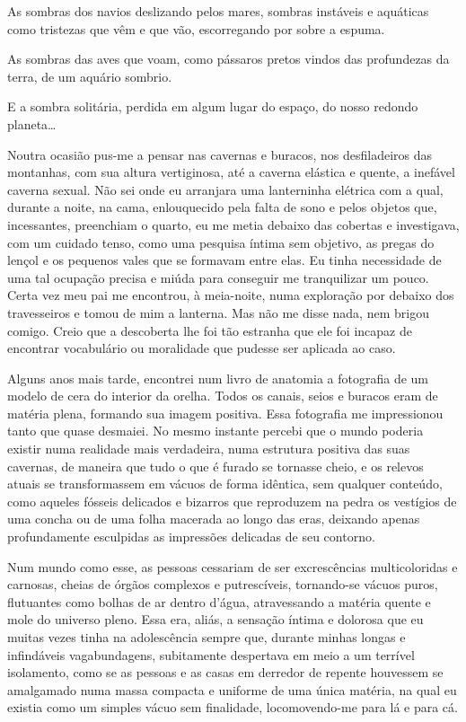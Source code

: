 As sombras dos navios deslizando pelos mares, sombras instáveis e aquáticas como tristezas que vêm e que vão, escorregando por sobre a espuma.

As sombras das aves que voam, como pássaros pretos vindos das profundezas da terra, de um aquário sombrio.

E a sombra solitária, perdida em algum lugar do espaço, do nosso redondo planeta\dots

Noutra ocasião pus-me a pensar nas cavernas e buracos, nos desfiladeiros das montanhas, com sua altura vertiginosa, até a caverna elástica e quente, a inefável caverna sexual. Não sei onde eu arranjara uma lanterninha elétrica com a qual, durante a noite, na cama, enlouquecido pela falta de sono e pelos objetos que, incessantes, preenchiam o quarto, eu me metia debaixo das cobertas e investigava, com um cuidado tenso, como uma pesquisa íntima sem objetivo, as pregas do lençol e os pequenos vales que se formavam entre elas. Eu tinha necessidade de uma tal ocupação precisa e miúda para conseguir me tranquilizar um pouco. Certa vez meu pai me encontrou, à meia-noite, numa exploração por debaixo dos travesseiros e tomou de mim a lanterna. Mas não me disse nada, nem brigou comigo. Creio que a descoberta lhe foi tão estranha que ele foi incapaz de encontrar vocabulário ou moralidade que pudesse ser aplicada ao caso.

Alguns anos mais tarde, encontrei num livro de anatomia a fotografia de um modelo de cera do interior da orelha. Todos os canais, seios e buracos eram de matéria plena, formando sua imagem positiva. Essa fotografia me impressionou tanto que quase desmaiei. No mesmo instante percebi que o mundo poderia existir numa realidade mais verdadeira, numa estrutura positiva das suas cavernas, de maneira que tudo o que é furado se tornasse cheio, e os relevos atuais se transformassem em vácuos de forma idêntica, sem qualquer conteúdo, como aqueles fósseis delicados e bizarros que reproduzem na pedra os vestígios de uma concha ou de uma folha macerada ao longo das eras, deixando apenas profundamente esculpidas as impressões delicadas de seu contorno.

Num mundo como esse, as pessoas cessariam de ser excrescências multicoloridas e carnosas, cheias de órgãos complexos e putrescíveis, tornando-se vácuos puros, flutuantes como bolhas de ar dentro d'água, atravessando a matéria quente e mole do universo pleno. Essa era, aliás, a sensação íntima e dolorosa que eu muitas vezes tinha na adolescência sempre que, durante minhas longas e infindáveis vagabundagens, subitamente despertava em meio a um terrível isolamento, como se as pessoas e as casas em derredor de repente houvessem se amalgamado numa massa compacta e uniforme de uma única matéria, na qual eu existia como um simples vácuo sem finalidade, locomovendo-me para lá e para cá.


